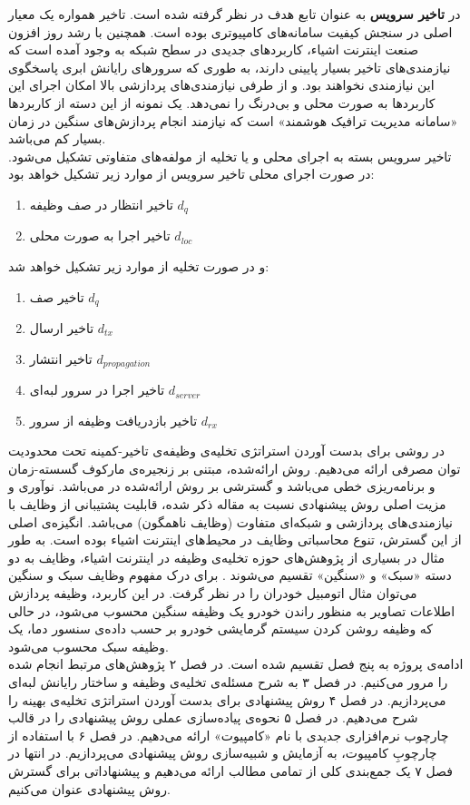 در \CurrentProject \textbf{تاخیر سرویس} به عنوان تابع هدف در نظر گرفته شده است. تاخیر همواره یک معیار اصلی در سنجش کیفیت سامانه‌های کامپیوتری بوده است. همچنین با رشد روز افزون صنعت اینترنت اشیاء، کاربردهای جدیدی در سطح شبکه به وجود آمده است که نیازمندی‌های تاخیر بسیار پایینی دارند، به طوری که سرورهای رایانش ابری پاسخگوی این نیازمندی نخواهند بود. و از طرفی نیازمندی‌های پردازشی بالا امکان اجرای این کاربردها به صورت محلی و بی‌درنگ را نمی‌دهد. یک نمونه از این دسته از کاربردها «سامانه مدیریت ترافیک هوشمند» است که نیازمند انجام پردازش‌های سنگین در زمان بسیار کم می‌باشد. \\

تاخیر سرویس بسته به اجرای محلی و یا تخلیه از مولفه‌های متفاوتی تشکیل می‌شود. در صورت اجرای محلی تاخیر سرویس از موارد زیر تشکیل خواهد بود:
\begin{enumerate}
	\item تاخیر انتظار در صف وظیفه $d_q$
	\item تاخیر اجرا به صورت محلی $d_{l o c}$
\end{enumerate}
و در صورت تخلیه از موارد زیر تشکیل خواهد شد:
\begin{enumerate}
	\item تاخیر صف $d_q$
	\item تاخیر ارسال $d_{t x}$
	\item تاخیر انتشار $d_{p r o p a g a t i o n}$
	\item تاخیر اجرا در سرور لبه‌ای $d_{s e r v e r}$
	\item تاخیر بازدریافت وظیفه از سرور $d_{r x}$
\end{enumerate}
در \CurrentProject روشی برای بدست آوردن استراتژی تخلیه‌ی وظیفه‌ی تاخیر-کمینه تحت محدودیت توان مصرفی ارائه می‌دهیم. روش ارائه‌شده، مبتنی بر زنجیره‌ی مارکوف گسسته-زمان و برنامه‌ریزی خطی می‌باشد و گسترشی بر روش ارائه‌شده در \cite{Liu} می‌باشد. نوآوری و مزیت اصلی روش پیشنهادی نسبت به مقاله ذکر شده،‌ قابلیت پشتیبانی از وظایف با نیازمندی‌های پردازشی و شبکه‌ای متفاوت (وظایف ناهمگون) می‌باشد. انگیزه‌ی اصلی از این گسترش، تنوع محاسباتی وظایف در محیط‌های اینترنت اشیاء بوده است. به طور مثال در بسیاری از پژوهش‌های حوزه تخلیه‌ی وظیفه در اینترنت اشیاء، وظایف به دو دسته «سبک» و «سنگین» تقسیم می‌شوند \cite{yousefpour, tran}. برای درک مفهوم وظایف سبک و سنگین می‌توان مثال اتومبیل خودران را در نظر گرفت. در این کاربرد، وظیفه پردازش اطلاعات تصاویر به منظور راندن خودرو یک وظیفه سنگین محسوب می‌شود، در حالی که وظیفه‌ روشن کردن سیستم گرمایشی خودرو بر حسب داده‌ی سنسور دما، یک وظیفه سبک محسوب می‌شود. \\

ادامه‌ی پروژه به پنج فصل تقسیم شده است. در فصل ۲ پژوهش‌های مرتبط انجام شده را مرور می‌کنیم. در فصل ۳ به شرح مسئله‌ی تخلیه‌ی وظیفه و ساختار رایانش لبه‌ای می‌پردازیم. در فصل ۴ روش پیشنهادی برای بدست آوردن استراتژی تخلیه‌ی بهینه را شرح می‌دهیم. در فصل ۵ نحوه‌ی پیاده‌سازی عملی روش پیشنهادی را در قالب چارچوب نرم‌افزاری جدیدی با نام «کامپیوت» ارائه می‌دهیم. در فصل ۶ با استفاده از چارچوبِ کامپیوت، به آزمایش و شبیه‌سازی روش پیشنهادی می‌پردازیم. در انتها در فصل ۷ یک جمع‌بندی کلی از تمامی مطالب ارائه می‌دهیم و پیشنهاداتی برای گسترش روش پیشنهادی عنوان می‌کنیم.
\clearpage
